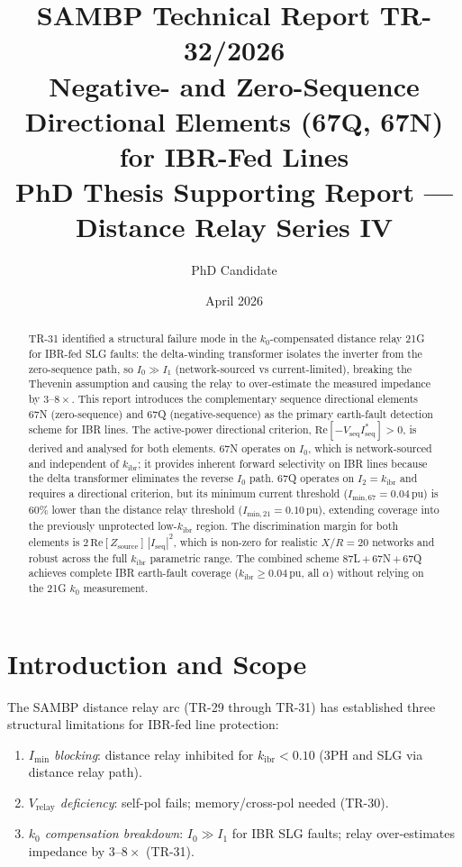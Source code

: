 \documentclass[11pt,a4paper]{article}
\title{%
  \textbf{\Large SAMBP Technical Report TR-32/2026}\\[6pt]
  \textbf{\large Negative- and Zero-Sequence Directional Elements (67Q, 67N)
          for IBR-Fed Lines}\\[4pt]
  \normalsize PhD Thesis Supporting Report --- Distance Relay Series IV
}
\author{PhD Candidate}
\date{April 2026}
\begin{document}
\maketitle\thispagestyle{fancy}

\begin{abstract}
TR-31 identified a structural failure mode in the $k_0$-compensated distance
relay 21G for IBR-fed SLG faults: the delta-winding transformer isolates the
inverter from the zero-sequence path, so $I_0 \gg I_1$ (network-sourced vs
current-limited), breaking the Thevenin assumption and causing the relay to
over-estimate the measured impedance by $3$--$8\times$.  This report introduces
the complementary sequence directional elements 67N (zero-sequence) and 67Q
(negative-sequence) as the primary earth-fault detection scheme for IBR lines.
The active-power directional criterion, $\mathrm{Re}[-V_\mathrm{seq}
I_\mathrm{seq}^*] > 0$, is derived and analysed for both elements.  67N operates
on $I_0$, which is network-sourced and independent of $k_\mathrm{ibr}$; it
provides inherent forward selectivity on IBR lines because the delta transformer
eliminates the reverse $I_0$ path.  67Q operates on $I_2 = k_\mathrm{ibr}$ and
requires a directional criterion, but its minimum current threshold
($I_\mathrm{min,67} = 0.04$\,pu) is 60\% lower than the distance relay threshold
($I_\mathrm{min,21} = 0.10$\,pu), extending coverage into the previously
unprotected low-$k_\mathrm{ibr}$ region.  The discrimination margin for both
elements is $2\,\mathrm{Re}[Z_\mathrm{source}]\,|I_\mathrm{seq}|^2$, which is
non-zero for realistic $X/R = 20$ networks and robust across the full
$k_\mathrm{ibr}$ parametric range.  The combined scheme 87L\,$+$\,67N\,$+$\,67Q
achieves complete IBR earth-fault coverage ($k_\mathrm{ibr} \geq 0.04$\,pu, all
$\alpha$) without relying on the 21G $k_0$ measurement.
\end{abstract}

\tableofcontents\newpage

\section{Introduction and Scope}
\label{sec:intro}

The SAMBP distance relay arc (TR-29 through TR-31) has established three
structural limitations for IBR-fed line protection:
\begin{enumerate}[label=(\roman*)]
  \item \emph{$I_\mathrm{min}$ blocking}: distance relay inhibited for $k_\mathrm{ibr}<0.10$
        (3PH and SLG via distance relay path).
  \item \emph{$V_\mathrm{relay}$ deficiency}: self-pol fails; memory/cross-pol needed
        (TR-30).
  \item \emph{$k_0$ compensation breakdown}: $I_0 \gg I_1$ for IBR SLG faults;
        relay over-estimates impedance by $3$--$8\times$ (TR-31).
\end{enumerate}
\end{document}
